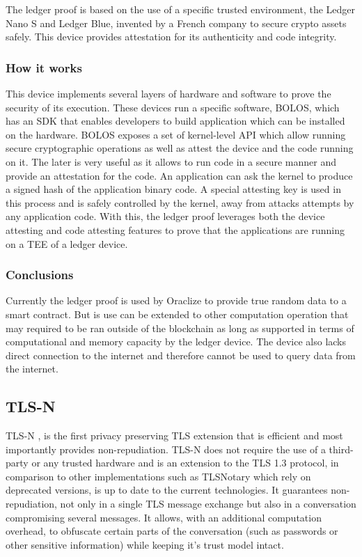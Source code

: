 The ledger proof is based on the use of a specific trusted environment, the Ledger Nano S and Ledger Blue, invented by a French company to secure crypto assets safely. This device provides attestation for its authenticity and code integrity.

\subsubsection{How it works}

This device implements several layers of hardware and software to prove the security of its execution. These devices run a specific software, BOLOS, which has an SDK that enables developers to build application which can be installed on the hardware. BOLOS exposes a set of kernel-level API which allow running secure cryptographic operations as well as attest the device and the code running on it. The later is very useful as it allows to run code in a secure manner and provide an attestation for the code. An application can ask the kernel to produce a signed hash of the application binary code. A special attesting key is used in this process and is safely controlled by the kernel, away from attacks attempts by any application code. With this, the ledger proof leverages both the device attesting and code attesting features to prove that the applications are running on a TEE of a ledger device.

\subsubsection{Conclusions}

Currently the ledger proof is used by Oraclize to provide true random data to a smart contract. But is use can be extended to other computation operation that may required to be ran outside of the blockchain as long as supported in terms of computational and memory capacity by the ledger device. The device also lacks direct connection to the internet and therefore cannot be used to query data from the internet.


\subsection{TLS-N}
TLS-N \cite{Ritzdorf2017}, is the first privacy preserving TLS extension that is efficient and most importantly provides non-repudiation. TLS-N does not require the use of a third-party or any trusted hardware and is an extension to the TLS 1.3 protocol, in comparison to other implementations such as TLSNotary which rely on deprecated versions, is up to date to the current technologies.
It guarantees non-repudiation, not only in a single TLS message exchange but also in a conversation compromising several messages. It allows, with an additional computation overhead, to obfuscate certain parts of the conversation (such as passwords or other sensitive information) while keeping it's trust model intact.

